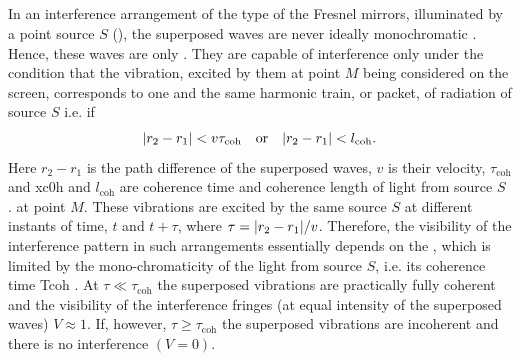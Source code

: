 \subsection{}\label{32.2.4} In an interference arrangement of the type of the Fresnel mirrors, illuminated by a point source $S$ (), the superposed waves are never ideally monochromatic . Hence, these waves are only . They are capable of interference
only under the condition that the vibration, excited by
them at point $M$ being considered on the screen, corresponds to one and the same harmonic train, or packet, of radiation of
source $S$  i.e. if
\begin{equation*}%
\abs{r_{2} - r_{1} } < v \tau_{\text{coh}} \qor \abs{r_{2} - r_{1} } < l_{\text{coh}}.
\end{equation*}
Here $r_{2} - r_{1}$ is the path difference of the superposed waves, $v$ is their velocity, $\tau_{\text{coh}}$ and xc0h and $l_{\text{coh}}$ are coherence time and coherence length of light from source $S$ .  at point $M$. These vibrations are excited by the same source $S$ at different instants of time, $t$ and $t + \tau$, where $\tau = \abs{ r_{2} - r_{1} }/v$. Therefore, the visibility of the interference pattern in such arrangements essentially depends on the , which is limited by the mono-chromaticity of the light from source $S$, i.e. its coherence time
Tcoh . At $\tau \ll \tau_{\text{coh}}$ the superposed vibrations are practically fully coherent and the visibility of the interference fringes (at equal intensity of the superposed waves) $V \approx 1$. If, however,
$\tau \geqslant \tau_{\text{coh}}$ the superposed vibrations are incoherent and there is no interference $(V = 0)$.

